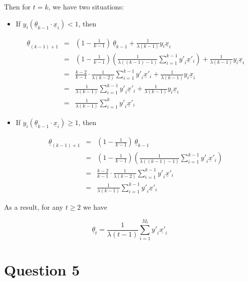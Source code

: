 \documentclass[12pt]{article}
\begin{document}
Then for $t = k$, we have two situations:

\begin{itemize}
\item If $y_i(\underline {\theta}_{k-1} \cdot \underline {x}_i) < 1$, then

\begin{eqnarray*}
\underline {\theta}_{(k-1)+1} & = & (1 - \frac {1}{k-1}) \: \underline
{\theta}_{k-1} + \frac {1}{\lambda (k-1)} y_i \underline {x}_i \\
& = & (1 - \frac {1}{k-1}) (\frac {1}{\lambda ((k-1)-1)}
\sum_{i=1}^{k-1} {{y'}_i \underline {x}'_i}) 
 + \frac {1}{\lambda (k-1)} y_i \underline {x}_i \\
& = & \frac {k-2}{k-1} \cdot \frac {1}{\lambda (k-2)} \sum_{i=1}^{k-1}
{{y'}_i \underline {x}'_i} + \frac {1}{\lambda 
  (k-1)} y_i \underline {x}_i \\
& = & \frac {1}{\lambda (k-1)} \sum_{i=1}^{k-1} {{y'}_i \underline
  {x}'_i} + \frac {1}{\lambda (k-1)} y_i \underline {x}_i \\
& = & \frac {1}{\lambda (k-1)} \sum_{i=1}^{k} {{y'}_i \underline
  {x}'_i}
\end{eqnarray*}

\item If $y_i(\underline {\theta}_{k-1} \cdot \underline {x}_i) \ge
  1$, then

\begin{eqnarray*}
\underline {\theta}_{(k-1)+1} & = & (1 - \frac {1}{k-1}) \: \underline
{\theta}_{k-1} \\
& = & (1 - \frac {1}{k-1}) (\frac {1}{\lambda ((k-1)-1)}
\sum_{i=1}^{k-1} {{y'}_i \underline {x}'_i}) \\
& = & \frac {k-2}{k-1} \cdot \frac {1}{\lambda (k-2)}
\sum_{i=1}^{k-1} {{y'}_i \underline {x}'_i} \\
& = & \frac {1}{\lambda (k-1)} \sum_{i=1}^{k-1} {{y'}_i \underline
  {x}'_i}
\end{eqnarray*}
\end{itemize}

As a result, for any $t \ge 2$ we have

\begin{equation*}
  \underline {\theta}_{t} = \frac {1}{\lambda (t-1)} \sum_{i=1}^{M_t}
  {{y'}_i \underline {x'}_i}
\end{equation*}

\section*{Question 5}
\end{document}
